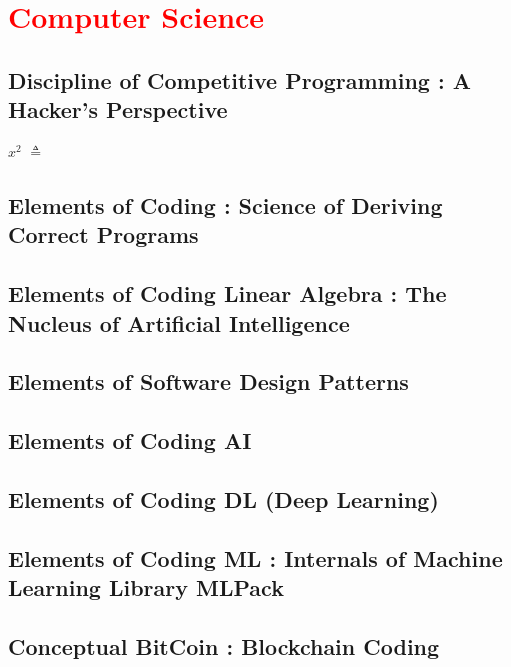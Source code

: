 \documentclass[makeidx, 12pt, oneside, onecolumn, openright, final, svgnames, dvipsnames, extrafontsizes]{memoir}
\renewcommand{\chaptername}{Dialogue}
\theoremstyle{problemstyle}
\begin{document}
\renewcommand{\contentsname}{Monographs}

\tableofcontents*


\mainmatter

\setlength{\headwidth}{\textwidth}
\setlength{\headwidth}{\textwidth}

\renewcommand{\chaptername}{Monograph}

\part{\textcolor{red}{Computer Science}}

\chapter{Discipline of Competitive Programming : A Hacker’s Perspective}
$x^2$ $\triangleq$

\chapter{Elements of Coding : Science of Deriving Correct Programs}

\chapter{Elements of Coding Linear Algebra : The Nucleus of Artificial Intelligence}


\chapter{Elements of Software Design Patterns}


\chapter{Elements of Coding AI}

\chapter{Elements of Coding DL (Deep Learning)}

\chapter{Elements of Coding ML : Internals of Machine Learning Library MLPack}

\chapter{Conceptual BitCoin : Blockchain Coding}
\end{document}
